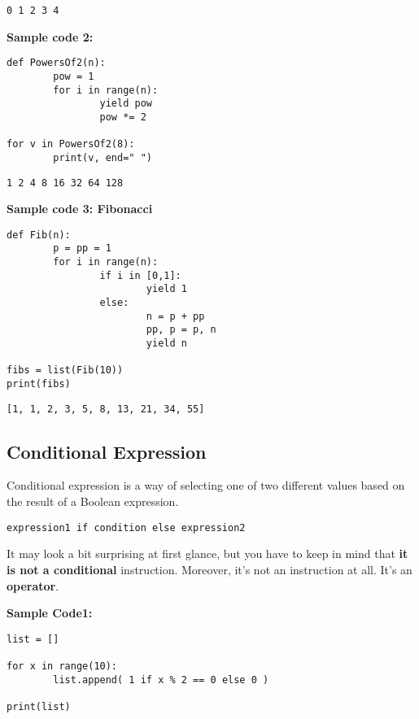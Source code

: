 \documentclass[11pt]{article}
\begin{document}
\begin{verbatim}
0 1 2 3 4 
\end{verbatim}


\vspace{10 mm}

\textbf{Sample code 2:} 
\begin{verbatim}
def PowersOf2(n):
        pow = 1
        for i in range(n):
                yield pow
                pow *= 2

for v in PowersOf2(8):
        print(v, end=" ")
\end{verbatim}

\begin{verbatim}
1 2 4 8 16 32 64 128 
\end{verbatim}

\vspace{12 mm}

\textbf{Sample code 3: Fibonacci} 
\begin{verbatim}
def Fib(n):
        p = pp = 1
        for i in range(n):
                if i in [0,1]:
                        yield 1
                else:
                        n = p + pp
                        pp, p = p, n
                        yield n

fibs = list(Fib(10))
print(fibs)
\end{verbatim}

\begin{verbatim}
[1, 1, 2, 3, 5, 8, 13, 21, 34, 55]
\end{verbatim}

\newpage

\subsection{Conditional Expression}
\label{sec:org7a22269}
Conditional expression is a way of selecting one of two different
values based on the result of a Boolean expression.

\texttt{expression1 if condition else expression2}

It may look a bit surprising at first glance, but you have to keep in
mind that \textbf{it is not a conditional} instruction. Moreover, it’s not an
instruction at all. It’s an \textbf{operator}.

\vspace{10 mm}

\textbf{Sample Code1:}
\begin{verbatim}
list = []

for x in range(10):
        list.append( 1 if x % 2 == 0 else 0 )

print(list)
\end{verbatim}
\end{document}
